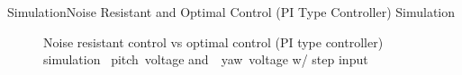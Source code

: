 \documentclass{beamer}
\begin{document}
\begin{frame}{Simulation}{Noise Resistant and Optimal Control (PI Type Controller) Simulation}
    \begin{figure}
      \centering
      \caption{Noise resistant control vs optimal control (PI type controller) simulation ~pitch~voltage and~~yaw~voltage w/ step input}
      \label{fig:LQR_PI_Sim_volt}
    \end{figure}
\end{frame}
\end{document}
